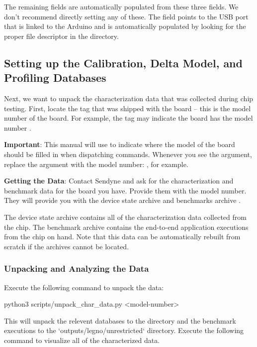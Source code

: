 The remaining fields are automatically populated from these three fields. We
don't recommend directly setting any of these. The  field
points to the USB port that is linked to the Arduino and is automatically
populated by looking for the proper file descriptor in the  directory.


\subsection{Setting up the Calibration, Delta Model, and Profiling Databases}

Next, we want to unpack the characterization data that was collected during chip testing. First,
locate the tag that was shipped with the \hcdc{} board -- this is the model number of the board. 
For example, the tag may indicate the board has the model number . 

\noindent\textbf{Important}: This manual will use  to indicate where the model of the board
should be filled in when dispatching commands. Whenever you see the  argument, replace the 
argument with the model number: , for example.

\noindent\textbf{Getting the Data}: Contact Sendyne and ask for the characterization and 
benchmark data for the board you have. Provide them with the model number. They will provide you 
with the device state archive  and benchmarks 
archive . 

The device state archive contains all of the characterization data collected from the chip. The benchmark
archive contains the end-to-end application executions from the chip on hand. Note that this data
can be automatically rebuilt from scratch if the archives cannot be located. 

\subsubsection{Unpacking and Analyzing the Data}

Execute the following command to unpack the data:

\begin{snippet}
python3 scripts/unpack_char_data.py <model-number>
\end{snippet}

This will unpack the relevent databases to the  directory and the benchmark
executions to the `outputs/legno/unrestricted` directory. Execute the following command to visualize all of the 
characterized data.

